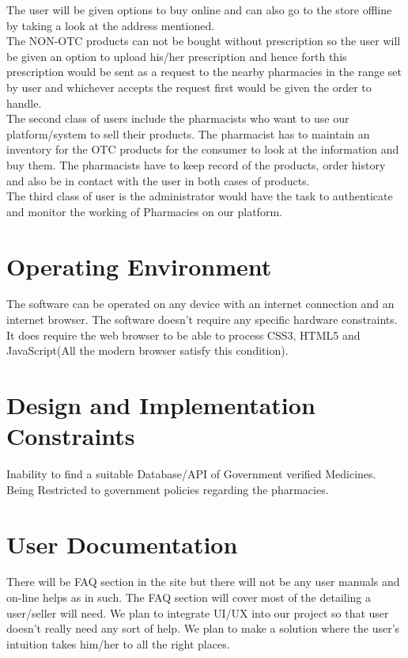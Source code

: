 \documentclass{scrreprt}
\begin{document}
 The user will be given options to buy online and can also go to the store offline by taking a look at the address mentioned.  \\

 The NON-OTC products can not be bought without prescription so the user will be given an option to upload his/her prescription and hence forth this prescription would be sent as a request to the nearby pharmacies in the range set by user and whichever accepts the request first would be given the order to handle.   \\

 The second class of users include the pharmacists who want to use our platform/system to sell their products. The pharmacist has to maintain an inventory for the OTC products for the consumer to look at the information and buy them. The pharmacists have to keep record of the products, order history and also be in contact with the user in both cases of products.   \\

 The third class of user is the administrator would have the task to authenticate and monitor the working of Pharmacies on our platform.   \\


\section{Operating Environment}

The software can be operated on any device with an internet connection and an internet browser. The software doesn’t require any specific hardware constraints. It does require the web browser to be able to process CSS3, HTML5 and JavaScript(All the modern browser satisfy this condition).


\section{Design and Implementation Constraints}

 Inability to find a suitable Database/API of Government verified Medicines.\\
 Being Restricted to government policies regarding the pharmacies.\\

\section{User Documentation}

 There will be FAQ section in the site but there will not be any user manuals and on-line helps as in such. The FAQ section will cover most of the detailing a user/seller will need. We plan to integrate UI/UX into our project so that user doesn’t really need any sort of help. We plan to make a solution where the user’s intuition takes him/her to all the right places.   \\
\end{document}
